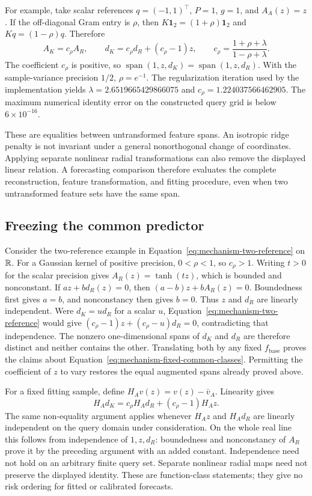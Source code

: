 For example, take scalar references $q=(-1,1)^\top$, $P=1$, $g=1$,
and $A_A(z)=z$. If the off-diagonal Gram entry is $\rho$, then
$K\mathbf1_2=(1+\rho)\mathbf1_2$ and $Kq=(1-\rho)q$. Therefore
\begin{equation}
 A_K=c_\rho A_R,\qquad
 d_K=c_\rho d_R+(c_\rho-1)z,\qquad
 c_\rho=\frac{1+\rho+\lambda}{1-\rho+\lambda}.
 \label{eq:mechanism-two-reference}
\end{equation}
The coefficient $c_\rho$ is positive, so
$\operatorname{span}(1,z,d_K)=\operatorname{span}(1,z,d_R)$.
With the sample-variance precision $1/2$, $\rho=e^{-1}$.
The regularization iteration used by the implementation yields
$\lambda=2.6519665429866075$ and $c_\rho=1.224037566462905$.
The maximum numerical identity error on the constructed query grid is
below $6\times10^{-16}$.

These are equalities between untransformed feature spans. An isotropic
ridge penalty is not invariant under a general nonorthogonal change of
coordinates. Applying separate nonlinear radial transformations can also
remove the displayed linear relation. A forecasting comparison therefore
evaluates the complete reconstruction, feature transformation, and fitting
procedure, even when two untransformed feature sets have the same span.

\subsection{Freezing the common predictor}
\label{app:mechanism-fixed-common}

Consider the two-reference example in
Equation~\eqref{eq:mechanism-two-reference} on $\mathbb{R}$. For a Gaussian
kernel of positive precision, $0<\rho<1$, so $c_\rho>1$.
Writing $t>0$ for the scalar precision gives $A_R(z)=\tanh(tz)$,
which is bounded and nonconstant.
If $az+bd_R(z)=0$, then $(a-b)z+bA_R(z)=0$. Boundedness first gives
$a=b$, and nonconstancy then gives $b=0$. Thus $z$ and $d_R$ are
linearly independent. Were $d_K=u d_R$ for a scalar $u$,
Equation~\eqref{eq:mechanism-two-reference} would give
$(c_\rho-1)z+(c_\rho-u)d_R=0$, contradicting that independence.
The nonzero one-dimensional spans of $d_K$ and $d_R$ are therefore
distinct and neither contains the other. Translating both by any fixed
$f_{\mathrm{base}}$ proves the claims about
Equation~\eqref{eq:mechanism-fixed-common-classes}. Permitting the
coefficient of $z$ to vary restores the equal augmented spans already
proved above.

For a fixed fitting sample, define $H_Av(z)=v(z)-\bar v_A$. Linearity
gives
\[
 H_A d_K=c_\rho H_A d_R+(c_\rho-1)H_A z.
\]
The same non-equality argument applies whenever $H_Az$ and $H_Ad_R$
are linearly independent on the query domain under consideration.
On the whole real line this follows from independence of $1,z,d_R$:
boundedness and nonconstancy of $A_R$ prove it by the preceding argument
with an added constant. Independence need not hold on an arbitrary
finite query set. Separate nonlinear radial maps need not preserve
the displayed identity. These are function-class statements; they
give no risk ordering for fitted or calibrated forecasts.

